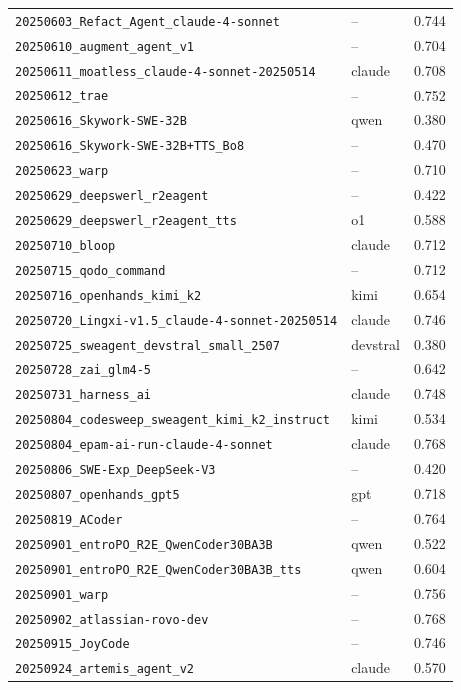 \begin{center}
\begin{longtable}{llc}
\texttt{20250603\_Refact\_Agent\_claude-4-sonnet} & -- & 0.744 \\
\texttt{20250610\_augment\_agent\_v1} & -- & 0.704 \\
\texttt{20250611\_moatless\_claude-4-sonnet-20250514} & claude & 0.708 \\
\texttt{20250612\_trae} & -- & 0.752 \\
\texttt{20250616\_Skywork-SWE-32B} & qwen & 0.380 \\
\texttt{20250616\_Skywork-SWE-32B+TTS\_Bo8} & -- & 0.470 \\
\texttt{20250623\_warp} & -- & 0.710 \\
\texttt{20250629\_deepswerl\_r2eagent} & -- & 0.422 \\
\texttt{20250629\_deepswerl\_r2eagent\_tts} & o1 & 0.588 \\
\texttt{20250710\_bloop} & claude & 0.712 \\
\texttt{20250715\_qodo\_command} & -- & 0.712 \\
\texttt{20250716\_openhands\_kimi\_k2} & kimi & 0.654 \\
\texttt{20250720\_Lingxi-v1.5\_claude-4-sonnet-20250514} & claude & 0.746 \\
\texttt{20250725\_sweagent\_devstral\_small\_2507} & devstral & 0.380 \\
\texttt{20250728\_zai\_glm4-5} & -- & 0.642 \\
\texttt{20250731\_harness\_ai} & claude & 0.748 \\
\texttt{20250804\_codesweep\_sweagent\_kimi\_k2\_instruct} & kimi & 0.534 \\
\texttt{20250804\_epam-ai-run-claude-4-sonnet} & claude & 0.768 \\
\texttt{20250806\_SWE-Exp\_DeepSeek-V3} & -- & 0.420 \\
\texttt{20250807\_openhands\_gpt5} & gpt & 0.718 \\
\texttt{20250819\_ACoder} & -- & 0.764 \\
\texttt{20250901\_entroPO\_R2E\_QwenCoder30BA3B} & qwen & 0.522 \\
\texttt{20250901\_entroPO\_R2E\_QwenCoder30BA3B\_tts} & qwen & 0.604 \\
\texttt{20250901\_warp} & -- & 0.756 \\
\texttt{20250902\_atlassian-rovo-dev} & -- & 0.768 \\
\texttt{20250915\_JoyCode} & -- & 0.746 \\
\texttt{20250924\_artemis\_agent\_v2} & claude & 0.570 \\

\end{longtable}
\end{center}
